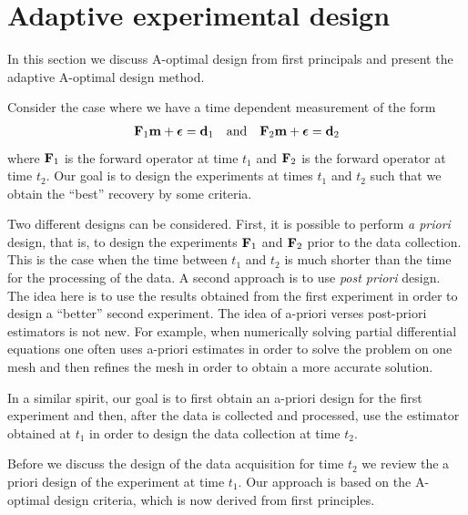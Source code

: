 \documentclass[english]{siamltex}
\newcommand{\bfF}	{{\bf{F}}}
\newcommand{\bfd}	{{\bf{d}}}
\newcommand{\bfm}	{{\bf{m}}}
\newcommand{\bfepsilon} {{\boldsymbol \epsilon}}
\begin{document}
{\section{ Adaptive experimental design }
\label{sec: Adaptive}
In this section we discuss A-optimal design from first principals and  present the adaptive A-optimal design method.   

\bigskip

Consider the case where we have a time dependent measurement of the form
\begin{eqnarray}
\label{data}
\bfF_{1} \bfm + \bfepsilon = \bfd_{1}\quad {\rm and} \quad \bfF_{2} \bfm + \bfepsilon = \bfd_{2}
\end{eqnarray}
where $\bfF_{1}$ is the forward operator at time $t_{1}$ and $\bfF_{2}$ is the forward operator 
at time $t_{2}$.
Our goal is to design the experiments at times $t_{1}$ and $t_{2}$ such that we obtain the ``best''
recovery by some criteria.

Two different designs can be considered. First, it is possible to perform {\em a priori} design, that is,
to design the experiments $\bfF_{1}$ and $\bfF_{2}$ prior to the data collection. This is the case
when the time between $t_{1}$ and $t_{2}$ is much shorter than the time for the processing
of the data. A second approach is to use {\em post priori} design. The idea here is to use the 
results obtained from the first experiment in order to design a ``better'' second experiment.
The idea of a-priori verses post-priori  estimators is not new. For example, when numerically 
solving partial differential
equations one often uses a-priori estimates in order to solve the problem on one mesh 
and then refines the mesh in order to obtain a more accurate solution.

In a similar spirit, our goal is to first obtain an a-priori design for the first experiment
and then, after the data is collected and processed, use the estimator
obtained at $t_{1}$ in order  to design the data collection
at time $t_{2}$.

Before we discuss the design of the data acquisition for time $t_{2}$
 we review the a priori design of the experiment at time $t_{1}$. Our approach is based
 on the  A-optimal design criteria, which is now derived from first principles.
 
}
\end{document}
